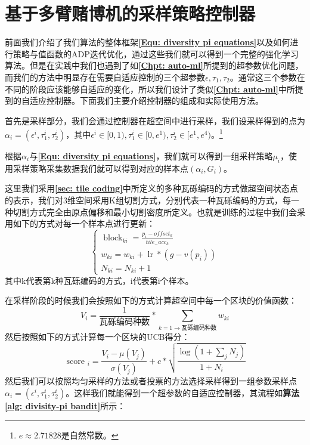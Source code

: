 \section{基于多臂赌博机的采样策略控制器}
前面我们介绍了我们算法的整体框架\textbf{\eqref{Equ: diversity pi equations}}以及如何进行策略与值函数的ADP迭代优化，通过这些我们就可以得到一个完整的强化学习算法。但是在实践中我们也遇到了如\textbf{\ref{Chpt: auto-ml}}所提到的超参数优化问题，而我们的方法中明显存在需要自适应控制的三个超参数$\epsilon,\tau_1,\tau_2$。通常这三个参数在不同的阶段应该能够自适应的变化，所以我们设计了类似\textbf{\ref{Chpt: auto-ml}}中所提到的自适应控制器。下面我们主要介绍控制器的组成和实际使用方法。

首先是采样部分，我们会通过控制器在超空间中进行采样，我们设采样得到的点为$\alpha_i=(\epsilon^i,\tau_{1}^i,\tau_2^i)$，其中$\epsilon^i \in [0,1), \tau_1^i \in [0,e^{1}), \tau_2^i \in [e^{1},e^{4})$。\footnote{$e \approx 2.71828$是自然常数。}

根据$\alpha_i$与\textbf{\eqref{Equ: diversity pi equations}}，我们就可以得到一组采样策略$\mu_i$，使用采样策略采集数据我们就可以得到对应的样本点$(\alpha_i,G_i)$。

这里我们采用\textbf{\ref{sec: tile coding}}中所定义的多种瓦砾编码的方式做超空间状态点的表示，我们对3维空间采用K组切割方式，分别代表一种瓦砾编码的方式，每一种切割方式完全由原点偏移和最小切割密度所定义。也就是训练的过程中我们会采用如下的方式对每一个样本点进行更新：
\begin{equation}
    \left\{\begin{array}{c}
\operatorname{block}_{k i}=\frac{p_{i}-o f f s e t_{k}}{t i l e_{-} a c c_{k}} \\
w_{k i}=w_{k i}+\operatorname{lr} *\left(g-v\left(p_{i}\right)\right) \\
N_{k i}=N_{k i}+1
\end{array}\right.
\end{equation}
其中k代表第k种瓦砾编码的方式，i代表第i个样本。

在采样阶段的时候我们会按照如下的方式计算超空间中每一个区块的价值函数：
\begin{equation}
    V_{i}=\frac{1}{\text{瓦砾编码种数}} * \sum_{k=1 \rightarrow \text{瓦砾编码种数}} w_{k i}
\end{equation}
然后按照如下的方式计算每一个区块的UCB得分：
\begin{equation}
    \text { score }_{i}=\frac{V_{i}-\mu\left(V_{j}\right)}{\sigma\left(V_{j}\right)}+c * \sqrt{\frac{\log \left(1+\sum_{j} N_{j}\right)}{1+N_{i}}}
\end{equation}
然后我们可以按照均匀采样的方法或者投票的方法选择采样得到一组参数采样点$\alpha_i=(\epsilon^i,\tau_1^i,\tau_2^i)$。这样我们就能得到一个超参数的自适应控制器，其流程如\textbf{算法\ref{alg: divisity-pi bandit}}所示：

